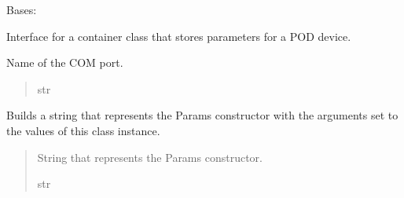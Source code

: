 \documentclass[letterpaper,10pt,english]{sphinxmanual}
\begin{document}
\begin{fulllineitems}
\label{\detokenize{Morelia.Parameters:Morelia.Parameters.ParamsBasic.Params}}
\pysigstartsignatures
{}
\pysigstopsignatures
\sphinxAtStartPar
Bases: 

\sphinxAtStartPar
Interface for a container class that stores parameters for a POD device.

\begin{fulllineitems}
\label{\detokenize{Morelia.Parameters:Morelia.Parameters.ParamsBasic.Params.port}}
\pysigstartsignatures
{}
\pysigstopsignatures
\sphinxAtStartPar
Name of the COM port.
\begin{quote}\begin{description}
\sphinxAtStartPar
str

\end{description}\end{quote}

\end{fulllineitems}


\begin{fulllineitems}
\label{\detokenize{Morelia.Parameters:Morelia.Parameters.ParamsBasic.Params.GetInit}}
\pysigstartsignatures
{}
\pysigstopsignatures
\sphinxAtStartPar
Builds a string that represents the Params constructor with the         arguments set to the values of this class instance.
\begin{quote}\begin{description}
\sphinxAtStartPar
String that represents the Params constructor.

\sphinxAtStartPar
str


\end{description}
\end{quote}
\end{fulllineitems}
\end{fulllineitems}
\end{document}
